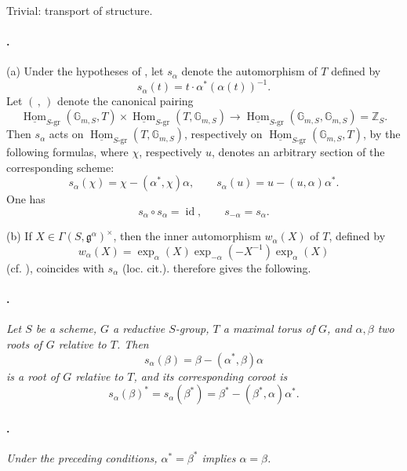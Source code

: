 Trivial: transport of structure.

\paragraph{.}
\textup{(a)} Under the hypotheses of , let \(s_\alpha\) denote the
automorphism of \(T\) defined by
\[
  s_\alpha(t)=t\mathbin{\cdot}\alpha^*(\alpha(t))^{-1}.
\]
Let \((\, ,\,)\) denote the canonical pairing
\[
  \underline{\operatorname{Hom}}_{S\text{-gr}}
    (\mathbb G_{m,S},T)
  \times
  \underline{\operatorname{Hom}}_{S\text{-gr}}
    (T,\mathbb G_{m,S})
  \longrightarrow
  \underline{\operatorname{Hom}}_{S\text{-gr}}
    (\mathbb G_{m,S},\mathbb G_{m,S})
  =\mathbb Z_S.
\]
Then \(s_\alpha\) acts on
\(\underline{\operatorname{Hom}}_{S\text{-gr}}
(T,\mathbb G_{m,S})\), respectively on
\(\underline{\operatorname{Hom}}_{S\text{-gr}}
(\mathbb G_{m,S},T)\), by the following formulas, where \(\chi\),
respectively \(u\), denotes an arbitrary section of the corresponding
scheme:
\[
  s_\alpha(\chi)=\chi-(\alpha^*,\chi)\alpha,
  \qquad
  s_\alpha(u)=u-(u,\alpha)\alpha^*.
\]
One has
\[
  s_\alpha\circ s_\alpha=\operatorname{id},
  \qquad
  s_{-\alpha}=s_\alpha.
\]

\textup{(b)} If
\(X\in\Gamma(S,\mathfrak g^\alpha)^\times\), then the inner
automorphism \(w_\alpha(X)\) of \(T\), defined by
\[
  w_\alpha(X)
  =
  \exp_\alpha(X)\exp_{-\alpha}(-X^{-1})\exp_\alpha(X)
\]
(cf. ), coincides with \(s_\alpha\) (loc. cit.).
 therefore gives the following.

\paragraph{.}
\textit{Let \(S\) be a scheme, \(G\) a reductive \(S\)-group, \(T\)
a maximal torus of \(G\), and \(\alpha,\beta\) two roots of \(G\)
relative to \(T\). Then}
\[
  s_\alpha(\beta)=\beta-(\alpha^*,\beta)\alpha
\]
\textit{is a root of \(G\) relative to \(T\), and its corresponding
coroot is}
\[
  s_\alpha(\beta)^*
  =
  s_\alpha(\beta^*)
  =
  \beta^*-(\beta^*,\alpha)\alpha^*.
\]

\paragraph{.}
\textit{Under the preceding conditions,
\(\alpha^*=\beta^*\) implies \(\alpha=\beta\).}


